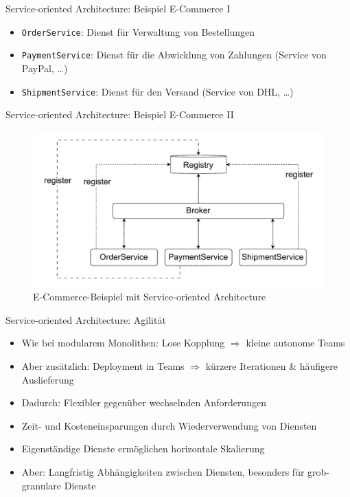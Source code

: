 \begin{frame}{Service-oriented Architecture: Beispiel E-Commerce I}
  \begin{itemize}
    \item \texttt{OrderService}: Dienst für Verwaltung von Bestellungen
    \item \texttt{PaymentService}: Dienst für die Abwicklung von Zahlungen (Service von PayPal, \ldots)
    \item \texttt{ShipmentService}: Dienst für den Versand (Service von DHL, \ldots)
  \end{itemize}
\end{frame}

\begin{frame}{Service-oriented Architecture: Beispiel E-Commerce II}
  \begin{figure}[!h]
    \centering
    \includegraphics[scale=0.50]{imglib/soa/soa-example}
    \caption{E-Commerce-Beispiel mit Service-oriented Architecture}
    \label{fig:soaecommerce}
  \end{figure}
\end{frame}

\begin{frame}{Service-oriented Architecture: Agilität}
  \begin{itemize}
    \item Wie bei modularem Monolithen: Lose Kopplung $\Rightarrow$ kleine autonome Teams
    \item Aber zusätzlich: Deployment in Teams $\Rightarrow$ kürzere Iterationen \& häufigere Auslieferung
    \item Dadurch: Flexibler gegenüber wechselnden Anforderungen
    \item Zeit- und Kosteneinsparungen durch Wiederverwendung von Diensten
    \item Eigenständige Dienste ermöglichen horizontale Skalierung
    \item Aber: Langfristig Abhängigkeiten zwischen Diensten, besonders für grob-granulare Dienste
    \end{itemize}
\end{frame}
